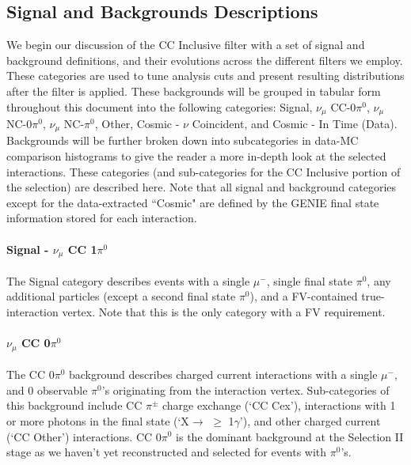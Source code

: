 \subsection{Signal and Backgrounds Descriptions}
\par We begin our discussion of the CC Inclusive filter with a set of signal and background definitions, and their evolutions across the different filters we employ.  These categories are used to tune analysis cuts and present resulting distributions after the filter is applied.  These backgrounds will be grouped in tabular form throughout this document into the following categories: Signal, $\nu_\mu$ CC-0$\pi^0$, $\nu_\mu$ NC-0$\pi^0$, $\nu_\mu$ NC-$\pi^0$, Other, Cosmic - $\nu$ Coincident, and Cosmic - In Time (Data). Backgrounds will be further broken down into subcategories in data-MC comparison histograms to give the reader a more in-depth look at the selected interactions.  These categories (and sub-categories for the CC Inclusive portion of the selection) are described here. Note that all signal and background categories except for the data-extracted ``Cosmic" are defined by the GENIE final state information stored for each interaction.


\paragraph{Signal - $\nu_\mu$ CC 1$\pi^0$} The Signal category describes events with a single $\mu^-$, single final state $\pi^0$, any additional particles (except a second final state $\pi^0$), and a FV-contained true-interaction vertex.  Note that this is the only category with a FV requirement.

\paragraph{ $\nu_\mu$ CC 0$\pi^0$}
The CC 0$\pi^0$ background describes charged current interactions with a single $\mu^-$, and 0 observable $\pi^0$'s originating from the interaction vertex.  Sub-categories of this background include CC $\pi^{\pm}$ charge exchange (`CC Cex'), interactions with 1 or more photons in the final state (`X$\rightarrow$ $\geq$ 1$\gamma$'), and other charged current (`CC Other') interactions. CC 0$\pi^0$ is the dominant background at the Selection II stage as we haven't yet reconstructed and selected for events with $\pi^0$'s.


